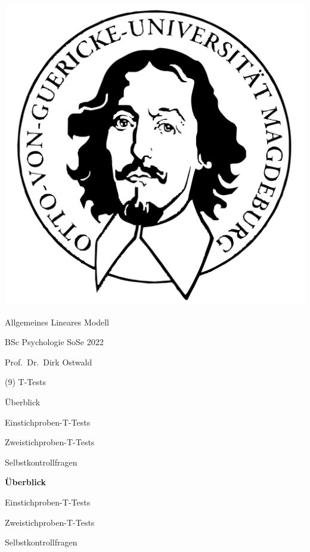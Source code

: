 \documentclass[
  8pt,
  ignorenonframetext,
]{beamer}
\author{}
\date{\vspace{-2.5em}}
\begin{document}
\begin{frame}[plain]{}
\protect\hypertarget{section}{}
\center

\begin{center}\includegraphics[width=0.2\linewidth]{9_Abbildungen/alm_9_otto} \end{center}

\vspace{2mm}

\huge

Allgemeines Lineares Modell \vspace{6mm}

\large

BSc Psychologie SoSe 2022

\vspace{6mm}
\normalsize

Prof.~Dr.~Dirk Ostwald
\end{frame}

\begin{frame}[plain]{}
\protect\hypertarget{section-1}{}
\center
\huge
\vfill

\noindent (9) T-Tests \vfill
\end{frame}

\begin{frame}[plain]{}
\protect\hypertarget{section-2}{}
\large
{}
\vfill

Überblick

Einstichproben-T-Tests

Zweistichproben-T-Tests

Selbstkontrollfragen \vfill
\end{frame}

\begin{frame}[plain]{}
\protect\hypertarget{section-3}{}
\large
{}
\vfill

\textbf{Überblick}

Einstichproben-T-Tests

Zweistichproben-T-Tests

Selbstkontrollfragen \vfill
\end{frame}
\end{document}
